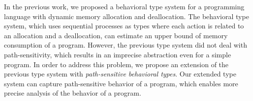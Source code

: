 \label{sec:abstraction} In the previous work, we proposed a behavioral
type system for a programming language with dynamic memory allocation
and deallocation.  The behavioral type system, which uses sequential
processes as types where each action is related to an allocation and a
deallocation, can estimate an upper bound of memory consumption of a
program.  However, the previous type system did not deal with
path-sensitivity, which results in an imprecise abstraction even for a
simple program.  In order to address this problem, we propose an
extension of the previous type system with \emph{path-sensitive
behavioral types}.  Our extended type system can capture path-sensitive
behavior of a program, which enables more precise analysis of the
behavior of a program.

